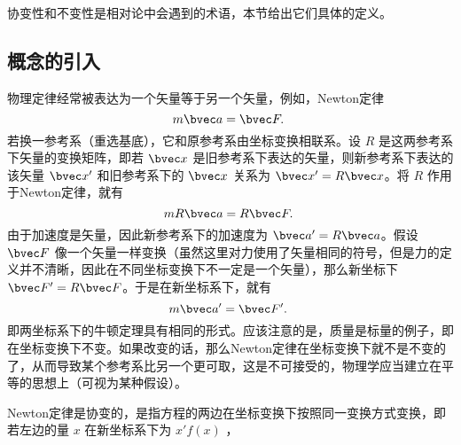 
协变性和不变性是相对论中会遇到的术语，本节给出它们具体的定义。
\subsection{概念的引入}
物理定律经常被表达为一个矢量等于另一个矢量，例如，Newton定律 
\begin{equation}
m\bvec a=\bvec F.~
\end{equation}
若换一参考系（重选基底），它和原参考系由坐标变换相联系。设 $R$ 是这两参考系下矢量的变换矩阵，即若 $\bvec x$ 是旧参考系下表达的矢量，则新参考系下表达的该矢量 $\bvec x'$ 和旧参考系下的 $\bvec x$ 关系为 $\bvec x'=R\bvec x$。将 $R$ 作用于Newton定律，就有
\begin{equation}
mR\bvec a=R\bvec F.~
\end{equation}
由于加速度是矢量，因此新参考系下的加速度为 $\bvec a'=R\bvec a$。假设 $\bvec F$ 像一个矢量一样变换（虽然这里对力使用了矢量相同的符号，但是力的定义并不清晰，因此在不同坐标变换下不一定是一个矢量），那么新坐标下 $\bvec F'=R\bvec F$。于是在新坐标系下，就有
\begin{equation}
m\bvec a'=\bvec F'.~
\end{equation}
即两坐标系下的牛顿定理具有相同的形式。应该注意的是，质量是标量的例子，即在坐标变换下不变。如果改变的话，那么Newton定律在坐标变换下就不是不变的了，从而导致某个参考系比另一个更可取，这是不可接受的，物理学应当建立在平等的思想上（可视为某种假设）。

Newton定律是协变的，是指方程的两边在坐标变换下按照同一变换方式变换，即若左边的量 $x$ 在新坐标系下为 $x'f(x)$ ，
















